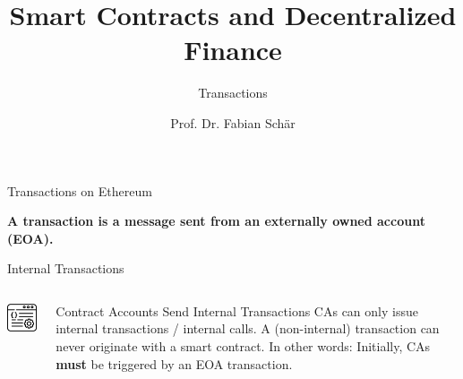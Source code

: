 \documentclass[handout]{beamer}
\title{Smart Contracts and Decentralized Finance}
\subtitle{Transactions}
\author{Prof. Dr. Fabian Schär}
\institute{University of Basel}
\begin{document}
\thispagestyle{empty}
\begin{frame}[noframenumbering]
	\titlepage
\end{frame}

\begin{frame}{Transactions on Ethereum}

\vspace{1em}
\textbf{A transaction is a message sent from an externally owned account (EOA).}

\vspace{0.5em}

\vspace{0.5em}

\vspace{1.0 em}

	
\end{frame}

\begin{frame}{Internal Transactions}

\begin{columns}[T]
	\begin{column}{0.25\textwidth}
		\includegraphics[width=3cm]{../assets/images/CA}
	\end{column} %
		
	\begin{column}{0.7\textwidth}
		\begin{keytakeaway}{Contract Accounts Send Internal Transactions}
			CAs can only issue internal transactions / internal calls. A (non-internal) transaction can never originate with a smart contract. In other words: Initially, CAs \textbf{must} be triggered by an EOA transaction.
		\end{keytakeaway}
	\end{column}
	
\end{columns}
\vspace{1em}



\end{frame}
\end{document}
